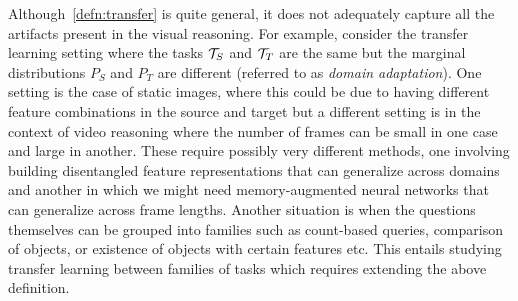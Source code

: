 Although~\cref{defn:transfer} is quite general, it does not adequately capture all the artifacts present in the visual reasoning.
For example, consider the transfer learning setting where the tasks $\mathcal{T}_S$ and $\mathcal{T}_T$ are the same 
but the marginal distributions $P_S$ and $P_T$ are different (referred to as \emph{domain adaptation}).
One setting is the case of static images, where this could be due to having different feature combinations in the source and
target but a different setting is in the context of video reasoning where the number of frames can be small in one case and 
large in another.
These require possibly very different methods, one involving building disentangled feature representations that can generalize across 
domains and another in which we might need memory-augmented neural networks that can generalize across frame lengths.
Another situation is when the questions themselves can be grouped into families such as count-based queries, 
comparison of objects, or existence of objects with certain features etc.
This entails studying transfer learning between families of tasks which requires extending the above definition.

